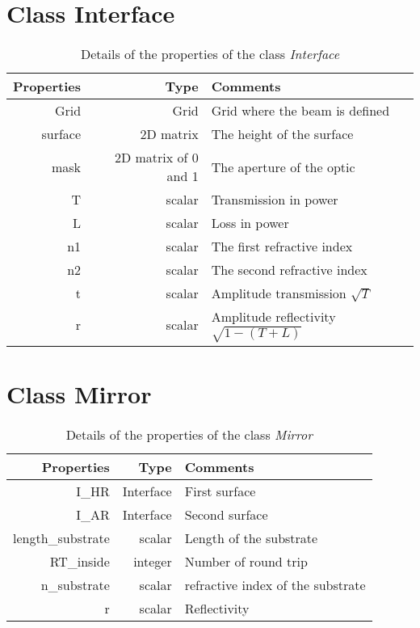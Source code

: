 \section{Class Interface}

\begin{table}
  \centering
  \caption{\label{App3:Inter} Details of the properties of the class \textsl{Interface} }
\begin{tabular}{|r r l|}
\hline
{\Large\strut} Properties & Type &  Comments \\
\hline
{\Large\strut} Grid &  Grid & Grid where the beam is defined \\
{\Large\strut} surface &  2D matrix & The height of the surface \\
{\Large\strut} mask &  2D matrix of 0 and 1 & The aperture of the optic \\
{\Large\strut} T &  scalar & Transmission in power \\
{\Large\strut} L &  scalar  & Loss in power \\
{\Large\strut} n1 &  scalar &  The first refractive index \\
{\Large\strut} n2 &  scalar &  The second refractive index \\
{\Large\strut} t &  scalar &  Amplitude transmission $\sqrt{T}$ \\
{\Large\strut} r &  scalar & Amplitude reflectivity $\sqrt{1-(T+L)}$ \\
\hline
\end{tabular}
\end{table}

\section{Class Mirror}

\begin{table}
  \centering
  \caption{\label{App3:Inter} Details of the properties of the class \textsl{Mirror} }
\begin{tabular}{|r r l|}
\hline
{\Large\strut} Properties & Type &  Comments \\
\hline
{\Large\strut} I\_HR &  Interface & First surface \\
{\Large\strut} I\_AR &  Interface & Second surface \\
{\Large\strut} length\_substrate & scalar & Length of the substrate \\
{\Large\strut} RT\_inside &  integer & Number of round trip \\
{\Large\strut} n\_substrate &  scalar &  refractive index of the substrate\\
{\Large\strut} r &  scalar & Reflectivity \\
\hline
\end{tabular}
\end{table}

